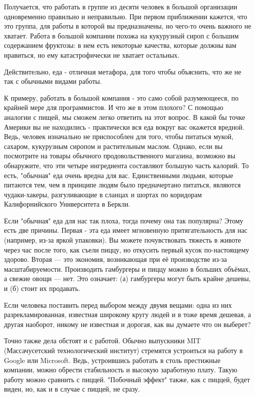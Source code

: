 \documentclass[ebook,12pt,oneside,openany]{memoir}
\begin{document}
Получается, что работать в группе из десяти человек в большой
организации одновременно правильно и неправильно. При первом
приближении кажется, что это группа, для работы в которой вы
предназначены, но чего-то очень важного не хватает. Работа в большой
компании похожа на кукурузный сироп с большим содержанием фруктозы: в
нем есть некоторые качества, которые должны вам нравиться, но ему
катастрофически не хватает остальных.

Действительно, еда - отличная метафора, для того чтобы объяснить, что
же не так с обычными видами работы.

К примеру, работать в большой компания - это само собой разумеющееся,
по крайней мере для программистов. И что же в этом плохого? С помощью
аналогии с пищей, мы сможем легко ответить на этот вопрос. В какой бы
точке Америки вы не находились - практически вся еда вокруг вас
окажется вредной. Ведь, человек изначально не приспособлен для того,
чтобы питаться мукой, сахаром, кукурузным сиропом и растительным
маслом. Однако, если вы посмотрите на товары обычного
продовольственного магазина, возможно вы обнаружите, что эти четыре
ингредиента составляют большую часть калорий. То есть, "обычная" еда
очень вредна для вас. Единственными людьми, которые питаются тем, чем
в принципе людям было предначертано питаться, являются чудаки-хакеры,
разгуливающие в сланцах и шортах по коридорам Калифорнийского
Университета в Беркли.

Если "обычная" еда для нас так плоха, тогда почему она так популярна?
Этому есть две причины. Первая - эта еда имеет мгновенную
притягательность для нас (например, из-за яркой упаковки). Вы можете
почувствовать тяжесть в животе через час после того, как съели пиццу,
но откусить первый кусок по-настоящему здорово. Вторая — это экономия,
возникающая при её производстве из-за масштабируемости. Производить
гамбургеры и пиццу можно в больших объёмах, а свежие овощи — нет. Это
означает: (а) гамбургеры могут быть крайне дешевы, и (б) стоит их
продавать.

Если человека поставить перед выбором между двумя вещами: одна из них
разрекламированная, известная широкому кругу людей и в тоже время
дешевая, а другая наоборот, никому не известная и дорогая, как вы
думаете что он выберет?

Точно также дела обстоят и с работой. Обычно выпускники MIT
(Массачусетский технологический институт) стремятся устроиться на
работу в Google или Microsoft. Ведь, устроившись работать в столь
престижные компании, можно обрести стабильность и высокую заработную
плату. Такую работу можно сравнить с пиццей. "Побочный эффект" также,
как с пиццей, будет виден, но, как и в случае с пиццей, не сразу.
\end{document}
